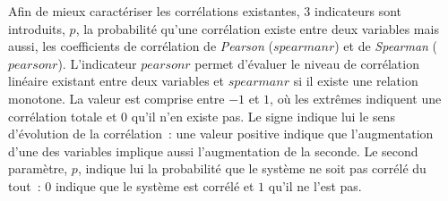 



Afin de mieux caractériser les corrélations existantes, $3$ indicateurs sont introduits,
$p$, la probabilité qu’une corrélation existe entre deux variables mais aussi, les
coefficients de corrélation de \textit{Pearson} ($spearmanr$) et de \textit{Spearman}
($pearsonr$). L’indicateur $pearsonr$ permet d’évaluer le niveau de corrélation linéaire
existant entre deux variables et $spearmanr$ si il existe une relation monotone. La valeur
est comprise entre $-1$ et $1$, où les extrêmes indiquent une corrélation totale et $0$
qu’il n’en existe pas. Le signe indique lui le sens d’évolution de la corrélation~: une
valeur positive indique que l’augmentation d’une des variables implique aussi
l’augmentation de la seconde. Le second paramètre, $p$, indique lui la probabilité que le
système ne soit pas corrélé du tout~: $0$ indique que le système est corrélé et $1$ qu’il
ne l’est pas.

